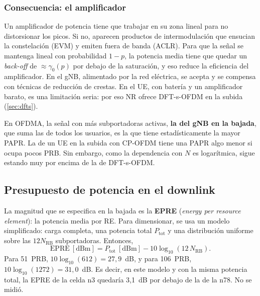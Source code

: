 \subsubsection{Consecuencia: el amplificador}
Un amplificador de potencia tiene que trabajar en su zona lineal para no distorsionar los picos. Si no, aparecen productos de intermodulación que ensucian la constelación (EVM) y emiten fuera de banda (ACLR). Para que la señal se mantenga lineal con probabilidad $1-p$, la potencia media tiene que quedar un \emph{back-off} de $\approx\gamma_0(p)$ por debajo de la saturación, y eso reduce la eficiencia del amplificador. En el gNB, alimentado por la red eléctrica, se acepta y se compensa con técnicas de reducción de crestas. En el UE, con batería y un amplificador barato, es una limitación seria: por eso NR ofrece DFT-s-OFDM en la subida (\cref{sec:dfts}).

En OFDMA, la señal con más subportadoras activas, \textbf{la del gNB en la bajada}, que suma las de todos los usuarios, es la que tiene estadísticamente la mayor PAPR. La de un UE en la subida con CP-OFDM tiene una PAPR algo menor si ocupa pocos PRB. Sin embargo, como la dependencia con $N$ es logarítmica, sigue estando muy por encima de la de DFT-s-OFDM.

\subsection{Presupuesto de potencia en el downlink}\label{sec:potencia_dl}
La magnitud que se especifica en la bajada es la \textbf{EPRE} (\emph{energy per resource element}): la potencia media por RE. Para dimensionar, se usa un modelo simplificado: carga completa, una potencia total $P_\text{tot}$ y una distribución uniforme sobre las $12N_\text{RB}$ subportadoras. Entonces,
\begin{equation}
\text{EPRE}~[\text{dBm}] = P_\text{tot}~[\text{dBm}] - 10\log_{10}(12\,N_\text{RB}).
\label{eq:epre}
\end{equation}
Para 51~PRB, $10\log_{10}(612) = 27{,}9$~dB, y para 106~PRB, $10\log_{10}(1272)=31{,}0$~dB. Es decir, en este modelo y con la misma potencia total, la EPRE de la celda n3 quedaría 3,1~dB por debajo de la de la n78. No se midió.

